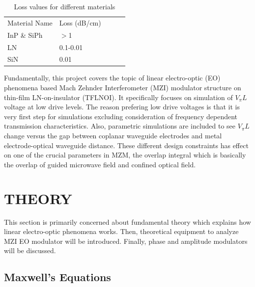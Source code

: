 \documentclass[thesis]{deutez}
\begin{document}
    \begin{table}[h]
        \centering
        \begin{tabular}{|l|l|l|ll}
            \cline{1-2}
            Material Name & Loss (dB/cm) \\ \cline{1-2}
            InP \& SiPh & $>$1       \\ \cline{1-2}
            LN & 0.1-0.01     \\ \cline{1-2}
            SiN         & 0.01      \\ \cline{1-2}
        \end{tabular}
        \caption{Loss values for different materials\cite{9}}
        \label{tab:losses_compared}
    \end{table}

    Fundamentally, this project covers the topic of linear electro-optic (EO) phenomena based Mach Zehnder Interferometer (MZI) modulator structure on thin-film LN-on-insulator (TFLNOI). It specifically focuses on simulation of $V_\pi L$ voltage at low drive levels. The reason prefering low drive voltages is that it is very first step for simulations excluding consideration of frequency dependent transmission characteristics. Also, parametric simulations are included to see $V_\pi L$ change versus the gap between coplanar waveguide electrodes and metal electrode-optical waveguide distance. These different design constraints has effect on one of the crucial parameters in MZM, the overlap integral which is basically the overlap of guided microwave field and confined optical field. 
    
    
    \newpage
        
\chapter{THEORY}

    This section is primarily concerned about fundamental theory which explains how linear electro-optic phenomena works. Then, theoretical equipment to analyze MZI EO modulator will be introduced. Finally, phase and amplitude modulators will be discussed.

    \section{Maxwell's Equations}
\end{document}
